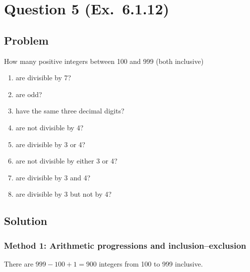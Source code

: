 \documentclass[12pt]{article}
\begin{document}

\newpage
\section{Question 5 (Ex.\ 6.1.12)}
\subsection{Problem}
How many positive integers between 100 and 999 (both inclusive)
\begin{enumerate}[label=(\alph*)]
\item are divisible by 7?
\item are odd?
\item have the same three decimal digits?
\item are not divisible by 4?
\item are divisible by 3 or 4?
\item are not divisible by either 3 or 4?
\item are divisible by 3 and 4?
\item are divisible by 3 but not by 4?
\end{enumerate}

\subsection{Solution}

\subsubsection{Method 1: Arithmetic progressions and inclusion--exclusion}
There are $999-100+1=900$ integers from 100 to 999 inclusive.
\end{document}
